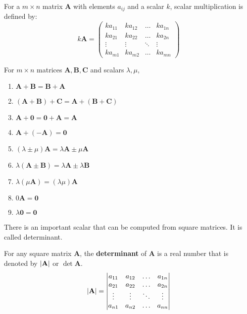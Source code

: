\documentclass{huhtakm-template-book}
\begin{document}
\begin{defn}
    For a $m\times n$ matrix $\mathbf{A}$ with elements $a_{ij}$ and a scalar $k$, scalar multiplication is defined by:
    \begin{equation*}
        k\mathbf{A}=\begin{pmatrix}
            ka_{11} & ka_{12} & \hdots & ka_{1n}\\
            ka_{21} & ka_{22} & \hdots & ka_{2n}\\
            \vdots & \vdots & \ddots & \vdots\\
            ka_{m1} & ka_{m2} & \hdots & ka_{mn}
        \end{pmatrix}
    \end{equation*}
\end{defn}
\begin{lem}
    For $m\times n$ matrices $\mathbf{A},\mathbf{B},\mathbf{C}$ and scalars $\lambda,\mu$,
    \begin{enumerate}
        \item $\mathbf{A}+\mathbf{B}=\mathbf{B}+\mathbf{A}$
        \item $(\mathbf{A}+\mathbf{B})+\mathbf{C}=\mathbf{A}+(\mathbf{B}+\mathbf{C})$
        \item $\mathbf{A}+\mathbf{0}=\mathbf{0}+\mathbf{A}=\mathbf{A}$
        \item $\mathbf{A}+(-\mathbf{A})=\mathbf{0}$
        \item $(\lambda\pm\mu)\mathbf{A}=\lambda\mathbf{A}\pm\mu\mathbf{A}$
        \item $\lambda(\mathbf{A}\pm\mathbf{B})=\lambda\mathbf{A}\pm\lambda\mathbf{B}$
        \item $\lambda(\mu\mathbf{A})=(\lambda\mu)\mathbf{A}$
        \item $0\mathbf{A}=\mathbf{0}$
        \item $\lambda\mathbf{0}=\mathbf{0}$
    \end{enumerate}
\end{lem}
There is an important scalar that can be computed from square matrices. It is called determinant.
\begin{defn}
    For any square matrix $\mathbf{A}$, the \textbf{determinant} of $\mathbf{A}$ is a real number that is denoted by $\left|{\mathbf{A}}\right|$ or $\det{\mathbf{A}}$.
    \begin{equation*}
        \left|{\mathbf{A}}\right|=\begin{vmatrix}
            a_{11} & a_{12} & \hdots & a_{1n}\\
            a_{21} & a_{22} & \hdots & a_{2n}\\
            \vdots & \vdots & \ddots & \vdots\\
            a_{n1} & a_{n2} & \hdots & a_{nn}
        \end{vmatrix}
    \end{equation*}
\end{defn}
\end{document}
